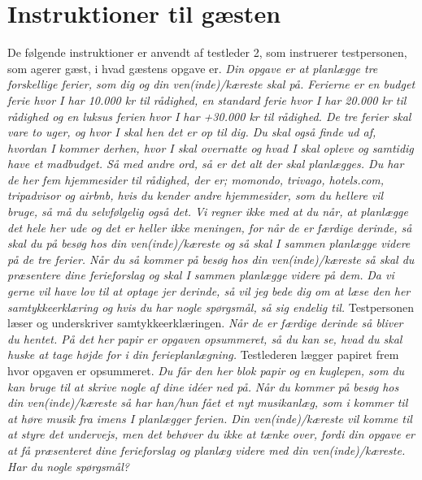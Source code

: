 \chapter{Instruktioner til gæsten}
\label{app:InstruktionerGaest}
%
De følgende instruktioner er anvendt af testleder 2, som instruerer testpersonen, som agerer gæst, i hvad gæstens opgave er.\blankline
%
\textit{Din opgave er at planlægge tre forskellige ferier, som dig og din ven(inde)/kæreste skal på. Ferierne er en budget ferie hvor I har 10.000 kr til rådighed, en standard ferie hvor I har 20.000 kr til rådighed og en luksus ferien hvor I har +30.000 kr til rådighed. De tre ferier skal vare to uger, og hvor I skal hen det er op til dig. Du skal også finde ud af, hvordan I kommer derhen, hvor I skal overnatte og hvad I skal opleve og samtidig have et madbudget. Så med andre ord, så er det alt der skal planlægges. Du har de her fem hjemmesider til rådighed, der er; momondo, trivago, hotels.com, tripadvisor og airbnb, hvis du kender andre hjemmesider, som du hellere vil bruge, så må du selvfølgelig også det. Vi regner ikke med at du når, at planlægge det hele her ude og det er heller ikke meningen, for når de er færdige derinde, så skal du på besøg hos din ven(inde)/kæreste og så skal I sammen planlægge videre på de tre ferier. Når du så kommer på besøg hos din ven(inde)/kæreste så skal du præsentere dine ferieforslag og skal I sammen planlægge videre på dem.}\blankline
%
\textit{Da vi gerne vil have lov til at optage jer derinde, så vil jeg bede dig om at læse den her samtykkeerklæring og hvis du har nogle spørgsmål, så sig endelig til.}\blankline
%
Testpersonen læser og underskriver samtykkeerklæringen.\blankline
%
\textit{Når de er færdige derinde så bliver du hentet. På det her papir er opgaven opsummeret, så du kan se, hvad du skal huske at tage højde for i din ferieplanlægning.}\blankline
%
Testlederen lægger papiret frem hvor opgaven er opsummeret. \blankline
%
\textit{Du får den her blok papir og en kuglepen, som du kan bruge til at skrive nogle af dine idéer ned på.}\blankline
%
\textit{Når du kommer på besøg hos din ven(inde)/kæreste så har han/hun fået et nyt musikanlæg, som i kommer til at høre musik fra imens I planlægger ferien. Din ven(inde)/kæreste vil komme til at styre det undervejs, men det behøver du ikke at tænke over, fordi din opgave er at få præsenteret dine ferieforslag og planlæg videre med din ven(inde)/kæreste. Har du nogle spørgsmål?}


